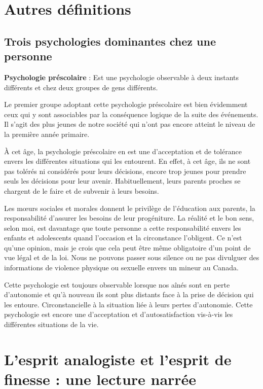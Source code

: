 \documentclass[12pt,oneside]{article}
\begin{document}
\section*{Autres définitions}

\subsection*{Trois psychologies dominantes chez une personne}

\textbf{Psychologie préscolaire} : Est une psychologie observable à deux instants différents et chez deux groupes de gens différents.

Le premier groupe adoptant cette psychologie préscolaire est bien évidemment ceux qui y sont associables par la conséquence logique de la suite des événements. Il s'agit des plus jeunes de notre société qui n'ont pas encore atteint le niveau de la première année primaire.

À cet âge, la psychologie préscolaire en est une d'acceptation et de tolérance envers les différentes situations qui les entourent. En effet, à cet âge, ils ne sont pas tolérés ni considérés pour leurs décisions, encore trop jeunes pour prendre seuls les décisions pour leur avenir. Habituellement, leurs parents proches se chargent de le faire et de subvenir à leurs besoins.

Les mœurs sociales et morales donnent le privilège de l'éducation aux parents, la responsabilité d'assurer les besoins de leur progéniture. La réalité et le bon sens, selon moi, est davantage que toute personne a cette responsabilité envers les enfants et adolescents quand l'occasion et la circonstance l'obligent. Ce n'est qu'une opinion, mais je crois que cela peut être même obligatoire d'un point de vue légal et de la loi. Nous ne pouvons passer sous silence ou ne pas divulguer des informations de violence physique ou sexuelle envers un mineur au Canada.

Cette psychologie est toujours observable lorsque nos aînés sont en perte d'autonomie et qu'à nouveau ils sont plus distants face à la prise de décision qui les entoure. Circonstancielle à la situation liée à leurs pertes d'autonomie. Cette psychologie est encore une d'acceptation et d'autosatisfaction vis-à-vis les différentes situations de la vie.

\section{L'esprit analogiste et l'esprit de finesse : une lecture narrée}
\end{document}
